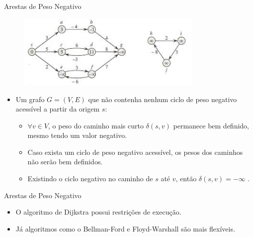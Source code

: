 \documentclass{beamer}
\begin{document}
	
	\begin{frame}{Arestas de Peso Negativo}
		\begin{figure}[H]
			\centering
			\includegraphics[width=0.8\textwidth]{img/negativo2.jpeg}
			\label{fig:negativo}
		\end{figure}
		
		\begin{itemize}
			\item Um grafo $G = (V,E)$ que não contenha nenhum ciclo de peso negativo acessível a partir da origem $s$:
			\begin{itemize}
				\item  $\forall v \in V$, o peso do caminho mais curto $\delta(s,v)$ permanece bem definido, mesmo tendo um valor negativo. 
				
				\pause
				
				\item Caso exista um ciclo de peso negativo acessível, os pesos dos caminhos não serão bem definidos. 
				
				\item Existindo o ciclo negativo no caminho de $s$ até $v$, então $\delta(s,v) = - \infty$ \cite{cormen2002algoritmos}. 
			\end{itemize}
		\end{itemize}
	\end{frame}
	
	\begin{frame}{Arestas de Peso Negativo}
		\begin{itemize}
			\item O algoritmo de Dijkstra possui restrições de execução.
			
			\bigskip
			
			\item Já algoritmos como o Bellman-Ford e Floyd-Warshall são mais flexíveis.
		\end{itemize}
	\end{frame}
	
\end{document}
